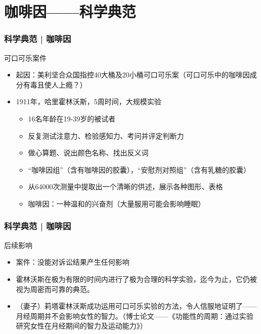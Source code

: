 \section{咖啡因——科学典范}
\begin{frame}
  \frametitle{科学典范 | 咖啡因}
  \begin{block}{可口可乐案件}
    \begin{itemize}
      \item 起因：美利坚合众国指控40大桶及20小桶可口可乐案（可口可乐中的咖啡因成分有毒且使人上瘾？）
      \pause
      \item 1911年，哈里\textbullet 霍林沃斯，5周时间，大规模实验
        \begin{itemize}
          \item 16名年龄在19-39岁的被试者
          \item 反复测试注意力、检验感知力、考问并评定判断力
          \item 做心算题、说出颜色名称、找出反义词
          \item “咖啡因组”（含有咖啡因的胶囊），“安慰剂对照组”（含有乳糖的胶囊）
          \item 从64000次测量中提取出一个清晰的供述，展示各种图形、表格
          \item 咖啡因：一种温和的兴奋剂（大量服用可能会影响睡眠）
        \end{itemize}
    \end{itemize}
  \end{block}
\end{frame}

\begin{frame}
  \frametitle{科学典范 | 咖啡因}
  \begin{block}{后续影响}
    \begin{itemize}
      \item 案件：没能对诉讼结果产生任何影响
      \item 霍林沃斯在极为有限的时间内进行了极为合理的科学实验，迄今为止，它仍被视为周密而可靠的典范。
      \item （妻子）莉塔\textbullet 霍林沃斯成功运用可口可乐实验的方法，令人信服地证明了——月经周期并不会影响女性的智力。（博士论文——《功能性的周期：通过实验研究女性在月经期间的智力及运动能力》）
    \end{itemize}
  \end{block}
\end{frame}

